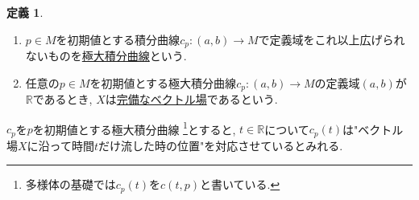 \documentclass[dvipdfmx,a4paper,11pt]{article}
\newcommand{\R}{\mathbb{R}}
\theoremstyle{definition}
\newtheorem{dfn}[thm]{定義}
\begin{document}
    \begin{tcolorbox}[
    colback = white,
    colframe = green!35!black,
    fonttitle = \bfseries,
    breakable = true]
    \begin{dfn}
      \text{}
      \begin{enumerate}
          \setlength{\parskip}{0cm}
  \setlength{\itemsep}{2pt} 
      \item $p \in M$を初期値とする積分曲線$c_{p} : (a,b) \rightarrow M$で定義域をこれ以上広げられないものを\underline{極大積分曲線}という.
      \item 任意の$p \in M$を初期値とする極大積分曲線$c_{p} : (a,b) \rightarrow M$の定義域$(a,b)$が$\R$であるとき, $X$は\underline{完備なベクトル場}であるという. 
      \end{enumerate}
    \end{dfn}
    \end{tcolorbox}
$c_{p}$を$p$を初期値とする極大積分曲線 \footnote{多様体の基礎では$c_{p}(t)$を$c(t,p)$と書いている.}とすると, $t \in \R$について$c_{p}(t)$は"ベクトル場$X$に沿って時間$t$だけ流した時の位置"を対応させているとみれる.
\end{document}
